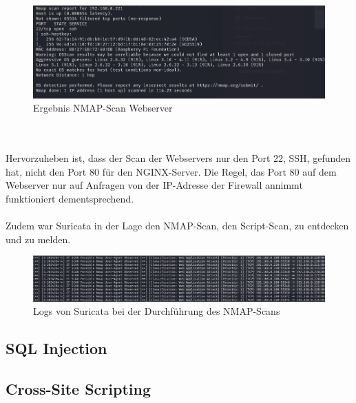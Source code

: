 \documentclass[
    a4paper,
    pagesize,
	pdftex,
    12pt,
]{scrartcl}
\begin{document}
\begin{figure}[!ht]
	\centering
	\includegraphics[width=15cm]{nmap-scan-webserver.png}
	\caption{Ergebnis NMAP-Scan Webserver}
	\label{fig:nmapwebserver}
\end{figure}
\\ \\
Hervorzuheben ist, dass der Scan der Webservers nur den Port 22, SSH, gefunden hat, nicht den Port 80 für den NGINX-Server. Die Regel, das Port 80 auf dem Webserver nur auf Anfragen von der IP-Adresse der Firewall annimmt funktioniert dementsprechend.
\\ \\
Zudem war Suricata in der Lage den NMAP-Scan, den Script-Scan, zu entdecken und zu melden.
\begin{figure}[!ht]
	\centering
	\includegraphics[width=17cm]{suricata-detection-nmap-scan.png}
	\caption{Logs von Suricata bei der Durchführung des NMAP-Scans}
	\label{fig:nmapsuricata}
\end{figure}

\subsection{SQL Injection}

\subsection{Cross-Site Scripting}
\end{document}
